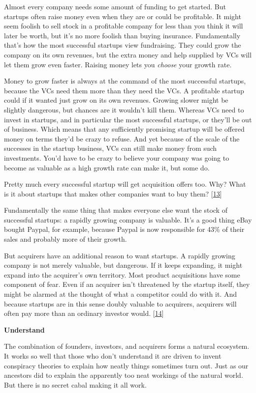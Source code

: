 Almost every company needs some amount of funding to get started. But
startups often raise money even when they are or could be profitable. It
might seem foolish to sell stock in a profitable company for less than
you think it will later be worth, but it's no more foolish than buying
insurance. Fundamentally that's how the most successful startups view
fundraising. They could grow the company on its own revenues, but the
extra money and help supplied by VCs will let them grow even faster.
Raising money lets you \emph{choose} your growth rate.

Money to grow faster is always at the command of the most successful
startups, because the VCs need them more than they need the VCs. A
profitable startup could if it wanted just grow on its own revenues.
Growing slower might be slightly dangerous, but chances are it wouldn't
kill them. Whereas VCs need to invest in startups, and in particular the
most successful startups, or they'll be out of business. Which means
that any sufficiently promising startup will be offered money on terms
they'd be crazy to refuse. And yet because of the scale of the successes
in the startup business, VCs can still make money from such investments.
You'd have to be crazy to believe your company was going to become as
valuable as a high growth rate can make it, but some do.

Pretty much every successful startup will get acquisition offers too.
Why? What is it about startups that makes other companies want to buy
them? {[}\hyperref[f13n]{13}{]}

Fundamentally the same thing that makes everyone else want the stock of
successful startups: a rapidly growing company is valuable. It's a good
thing eBay bought Paypal, for example, because Paypal is now responsible
for 43\% of their sales and probably more of their growth.

But acquirers have an additional reason to want startups. A rapidly
growing company is not merely valuable, but dangerous. If it keeps
expanding, it might expand into the acquirer's own territory. Most
product acquisitions have some component of fear. Even if an acquirer
isn't threatened by the startup itself, they might be alarmed at the
thought of what a competitor could do with it. And because startups are
in this sense doubly valuable to acquirers, acquirers will often pay
more than an ordinary investor would. {[}\hyperref[f14n]{14}{]}

\textbf{Understand}

The combination of founders, investors, and acquirers forms a natural
ecosystem. It works so well that those who don't understand it are
driven to invent conspiracy theories to explain how neatly things
sometimes turn out. Just as our ancestors did to explain the apparently
too neat workings of the natural world. But there is no secret cabal
making it all work.

